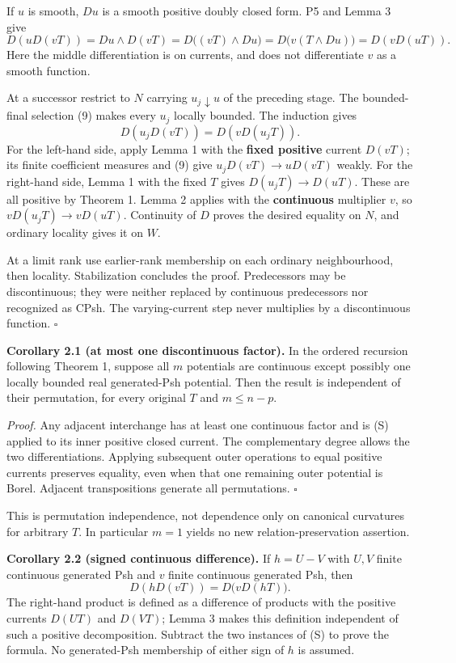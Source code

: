 \documentclass[
  11pt,
]{article}
\begin{document}
If \(u\) is smooth, \(Du\) is a smooth positive doubly closed form. P5
and Lemma 3 give \[
 D(uD(vT))=Du\wedge D(vT)
          =D\bigl((vT)\wedge Du\bigr)
          =D\bigl(v(T\wedge Du)\bigr)
          =D(vD(uT)).                                         \tag{10}
\] Here the middle differentiation is on currents, and does not
differentiate \(v\) as a smooth function.

At a successor restrict to \(N\) carrying \(u_j\downarrow u\) of the
preceding stage. The bounded-final selection (9) makes every \(u_j\)
locally bounded. The induction gives
\[D(u_jD(vT))=D(vD(u_jT)).                                   \tag{11}\]
For the left-hand side, apply Lemma 1 with the \textbf{fixed positive}
current \(D(vT)\); its finite coefficient measures and (9) give
\(u_jD(vT)\to uD(vT)\) weakly. For the right-hand side, Lemma 1 with the
fixed \(T\) gives \(D(u_jT)\to D(uT)\). These are all positive by
Theorem 1. Lemma 2 applies with the \textbf{continuous} multiplier
\(v\), so \(vD(u_jT)\to vD(uT)\). Continuity of \(D\) proves the desired
equality on \(N\), and ordinary locality gives it on \(W\).

At a limit rank use earlier-rank membership on each ordinary
neighbourhood, then locality. Stabilization concludes the proof.
Predecessors may be discontinuous; they were neither replaced by
continuous predecessors nor recognized as CPsh. The varying-current step
never multiplies by a discontinuous function. \(\square\)

\textbf{Corollary 2.1 (at most one discontinuous factor).} In the
ordered recursion following Theorem 1, suppose all \(m\) potentials are
continuous except possibly one locally bounded real generated-Psh
potential. Then the result is independent of their permutation, for
every original \(T\) and \(m\leq n-p\).

\emph{Proof.} Any adjacent interchange has at least one continuous
factor and is (S) applied to its inner positive closed current. The
complementary degree allows the two differentiations. Applying
subsequent outer operations to equal positive currents preserves
equality, even when that one remaining outer potential is Borel.
Adjacent transpositions generate all permutations. \(\square\)

This is permutation independence, not dependence only on canonical
curvatures for arbitrary \(T\). In particular \(m=1\) yields no new
relation-preservation assertion.

\textbf{Corollary 2.2 (signed continuous difference).} If \(h=U-V\) with
\(U,V\) finite continuous generated Psh and \(v\) finite continuous
generated Psh, then
\[D(hD(vT))=D\bigl(vD(hT)\bigr).                             \tag{12}\]
The right-hand product is defined as a difference of products with the
positive currents \(D(UT)\) and \(D(VT)\); Lemma 3 makes this definition
independent of such a positive decomposition. Subtract the two instances
of (S) to prove the formula. No generated-Psh membership of either sign
of \(h\) is assumed.
\end{document}
